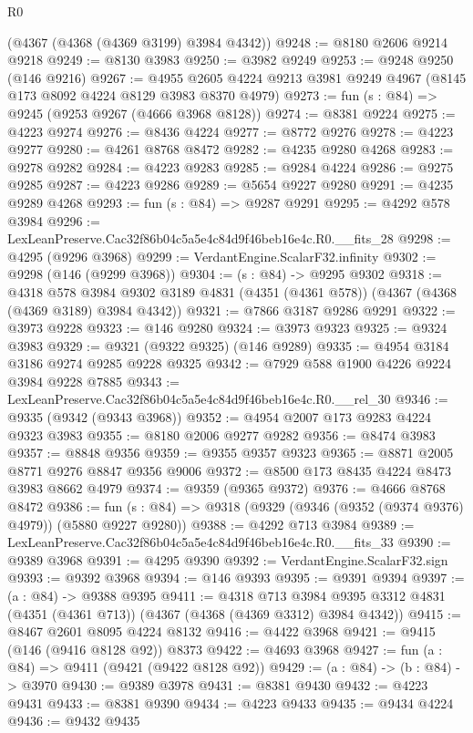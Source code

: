 \begin{lexlean}{R0}
\begin{coremodule}
    (@4367 (@4368 (@4369 @3199) @3984 @4342))
@9248 := @8180 @2606 @9214 @9218
@9249 := @8130 @3983
@9250 := @3982 @9249
@9253 := @9248 @9250 (@146 @9216)
@9267 := @4955 @2605 @4224 @9213 @3981 @9249 @4967 (@8145 @173 @8092 @4224 @8129 @3983 @8370 @4979)
@9273 := fun (s : @84) => @9245 (@9253 @9267 (@4666 @3968 @8128))
@9274 := @8381 @9224
@9275 := @4223 @9274
@9276 := @8436 @4224
@9277 := @8772 @9276
@9278 := @4223 @9277
@9280 := @4261 @8768 @8472
@9282 := @4235 @9280 @4268
@9283 := @9278 @9282
@9284 := @4223 @9283
@9285 := @9284 @4224
@9286 := @9275 @9285
@9287 := @4223 @9286
@9289 := @5654 @9227 @9280
@9291 := @4235 @9289 @4268
@9293 := fun (s : @84) => @9287 @9291
@9295 := @4292 @578 @3984
@9296 := LexLeanPreserve.Cac32f86b04c5a5e4c84d9f46beb16e4c.R0.__fits_28
@9298 := @4295 (@9296 @3968)
@9299 := VerdantEngine.ScalarF32.infinity
@9302 := @9298 (@146 (@9299 @3968))
@9304 := (s : @84) -> @9295 @9302
@9318 := @4318
    @578
    @3984
    @9302
    @3189
    @4831
    (@4351 (@4361 @578))
    (@4367 (@4368 (@4369 @3189) @3984 @4342))
@9321 := @7866 @3187 @9286 @9291
@9322 := @3973 @9228
@9323 := @146 @9280
@9324 := @3973 @9323
@9325 := @9324 @3983
@9329 := @9321 (@9322 @9325) (@146 @9289)
@9335 := @4954 @3184 @3186 @9274 @9285 @9228 @9325
@9342 := @7929 @588 @1900 @4226 @9224 @3984 @9228 @7885
@9343 := LexLeanPreserve.Cac32f86b04c5a5e4c84d9f46beb16e4c.R0.__rel_30
@9346 := @9335 (@9342 (@9343 @3968))
@9352 := @4954 @2007 @173 @9283 @4224 @9323 @3983
@9355 := @8180 @2006 @9277 @9282
@9356 := @8474 @3983
@9357 := @8848 @9356
@9359 := @9355 @9357 @9323
@9365 := @8871 @2005 @8771 @9276 @8847 @9356 @9006
@9372 := @8500 @173 @8435 @4224 @8473 @3983 @8662 @4979
@9374 := @9359 (@9365 @9372)
@9376 := @4666 @8768 @8472
@9386 := fun (s : @84) => @9318 (@9329 (@9346 (@9352 (@9374 @9376) @4979)) (@5880 @9227 @9280))
@9388 := @4292 @713 @3984
@9389 := LexLeanPreserve.Cac32f86b04c5a5e4c84d9f46beb16e4c.R0.__fits_33
@9390 := @9389 @3968
@9391 := @4295 @9390
@9392 := VerdantEngine.ScalarF32.sign
@9393 := @9392 @3968
@9394 := @146 @9393
@9395 := @9391 @9394
@9397 := (a : @84) -> @9388 @9395
@9411 := @4318
    @713
    @3984
    @9395
    @3312
    @4831
    (@4351 (@4361 @713))
    (@4367 (@4368 (@4369 @3312) @3984 @4342))
@9415 := @8467 @2601 @8095 @4224 @8132
@9416 := @4422 @3968
@9421 := @9415 (@146 (@9416 @8128 @92)) @8373
@9422 := @4693 @3968
@9427 := fun (a : @84) => @9411 (@9421 (@9422 @8128 @92))
@9429 := (a : @84) -> (b : @84) -> @3970
@9430 := @9389 @3978
@9431 := @8381 @9430
@9432 := @4223 @9431
@9433 := @8381 @9390
@9434 := @4223 @9433
@9435 := @9434 @4224
@9436 := @9432 @9435

\end{coremodule}
\end{lexlean}
